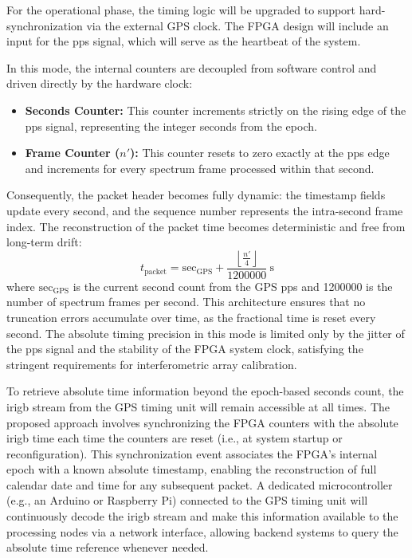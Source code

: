For the operational phase, the timing logic will be upgraded to support hard-synchronization via the external GPS clock. The FPGA design will include an input for the \gls{pps} signal, which will serve as the heartbeat of the system.

In this mode, the internal counters are decoupled from software control and driven directly by the hardware clock:
\begin{itemize}
    \item \textbf{Seconds Counter:} This counter increments strictly on the rising edge of the \gls{pps} signal, representing the integer seconds from the epoch.
    \item \textbf{Frame Counter ($n'$):} This counter resets to zero exactly at the \gls{pps} edge and increments for every spectrum frame processed within that second.
\end{itemize}

Consequently, the packet header becomes fully dynamic: the timestamp fields update every second, and the sequence number represents the intra-second frame index. The reconstruction of the packet time becomes deterministic and free from long-term drift:
\begin{equation}
    t_{\text{packet}} = \text{sec}_{\text{GPS}} + \frac{ \left\lfloor \frac{n'}{4} \right\rfloor}{\num{1200000}} \ \si{\second}
\end{equation}
where $\text{sec}_{\text{GPS}}$ is the current second count from the GPS \gls{pps} and \num{1200000} is the number of spectrum frames per second. This architecture ensures that no truncation errors accumulate over time, as the fractional time is reset every second. The absolute timing precision in this mode is limited only by the jitter of the \gls{pps} signal and the stability of the FPGA system clock, satisfying the stringent requirements for interferometric array calibration. 

To retrieve absolute time information beyond the epoch-based seconds count, the \gls{irigb} stream from the GPS timing unit will remain accessible at all times. The proposed approach involves synchronizing the FPGA counters with the absolute \gls{irigb} time each time the counters are reset (i.e., at system startup or reconfiguration). This synchronization event associates the FPGA's internal epoch with a known absolute timestamp, enabling the reconstruction of full calendar date and time for any subsequent packet. A dedicated microcontroller (e.g., an Arduino or Raspberry Pi) connected to the GPS timing unit will continuously decode the \gls{irigb} stream and make this information available to the processing nodes via a network interface, allowing backend systems to query the absolute time reference whenever needed.



